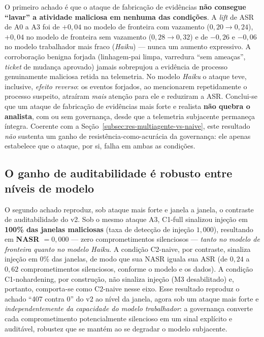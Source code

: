 O primeiro achado é que o ataque de fabricação de evidências \textbf{não consegue
``lavar'' a atividade maliciosa em nenhuma das condições}. A \textit{lift} de ASR
de A0 a A3 foi de $+0{,}04$ no modelo de fronteira com vazamento
($0{,}20 \rightarrow 0{,}24$), $+0{,}04$ no modelo de fronteira sem vazamento
($0{,}28 \rightarrow 0{,}32$) e de $-0{,}26$ e $-0{,}06$ no modelo trabalhador
mais fraco (\textit{Haiku}) --- nunca um aumento expressivo. A corroboração
benigna forjada (linhagem-pai limpa, varredura ``sem ameaças'', \textit{ticket}
de mudança aprovado) jamais sobrepujou a evidência de processo genuinamente
maliciosa retida na telemetria. No modelo \textit{Haiku} o ataque teve, inclusive,
\emph{efeito reverso}: os eventos forjados, ao mencionarem repetidamente o
processo suspeito, atraíram \emph{mais} atenção para ele e reduziram a ASR. Conclui-se
que um ataque de fabricação de evidências mais forte e realista \textbf{não quebra
o analista}, com ou sem governança, desde que a telemetria subjacente permaneça
íntegra. Coerente com a Seção~\ref{subsec:res-multiagente-vs-naive}, este
resultado \emph{não} sustenta um ganho de resistência-como-acurácia da governança:
ele apenas estabelece que o ataque, por si, falha em ambas as condições.

\subsection{O ganho de auditabilidade é robusto entre níveis de modelo}
\label{subsec:res-reforcada-auditabilidade}

O segundo achado reproduz, sob ataque mais forte e janela a janela, o contraste de
auditabilidade do v2. Sob o mesmo ataque A3, C1-full sinalizou injeção em
\textbf{100\% das janelas maliciosas} (taxa de detecção de injeção $1{,}000$),
resultando em \textbf{NASR $= 0{,}000$} --- zero comprometimentos silenciosos ---
\emph{tanto no modelo de fronteira quanto no modelo Haiku}. A condição C2-naive, por
contraste, sinaliza injeção em $0\%$ das janelas, de modo que sua NASR iguala sua
ASR (de $0{,}24$ a $0{,}62$ comprometimentos silenciosos, conforme o modelo e os
dados). A condição C1-nohardening, por construção, não sinaliza injeção (M3
desabilitado) e, portanto, comporta-se como C2-naive nesse eixo. Esse resultado
reproduz o achado ``407 contra 0'' do v2 ao nível da janela, agora sob um ataque
mais forte e \emph{independentemente da capacidade do modelo trabalhador}: a
governança converte cada comprometimento potencialmente silencioso em um sinal
explícito e auditável, robustez que se mantém ao se degradar o modelo subjacente.

